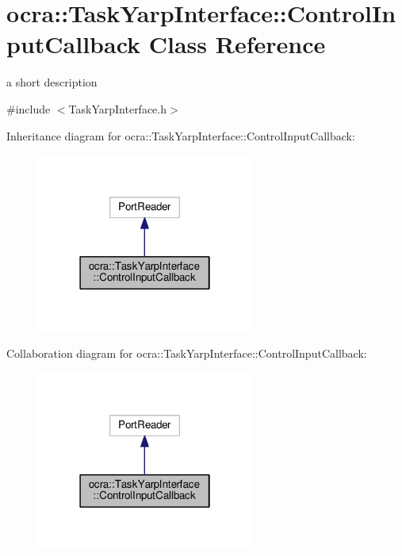 \hypertarget{classocra_1_1TaskYarpInterface_1_1ControlInputCallback}{}\section{ocra\+:\+:Task\+Yarp\+Interface\+:\+:Control\+Input\+Callback Class Reference}
\label{classocra_1_1TaskYarpInterface_1_1ControlInputCallback}


a short description  




{\ttfamily \#include $<$Task\+Yarp\+Interface.\+h$>$}



Inheritance diagram for ocra\+:\+:Task\+Yarp\+Interface\+:\+:Control\+Input\+Callback\+:
\nopagebreak
\begin{figure}[H]
\begin{center}
\leavevmode
\includegraphics[width=202pt]{d8/da9/classocra_1_1TaskYarpInterface_1_1ControlInputCallback__inherit__graph}
\end{center}
\end{figure}


Collaboration diagram for ocra\+:\+:Task\+Yarp\+Interface\+:\+:Control\+Input\+Callback\+:
\nopagebreak
\begin{figure}[H]
\begin{center}
\leavevmode
\includegraphics[width=202pt]{dc/d21/classocra_1_1TaskYarpInterface_1_1ControlInputCallback__coll__graph}
\end{center}
\end{figure}
